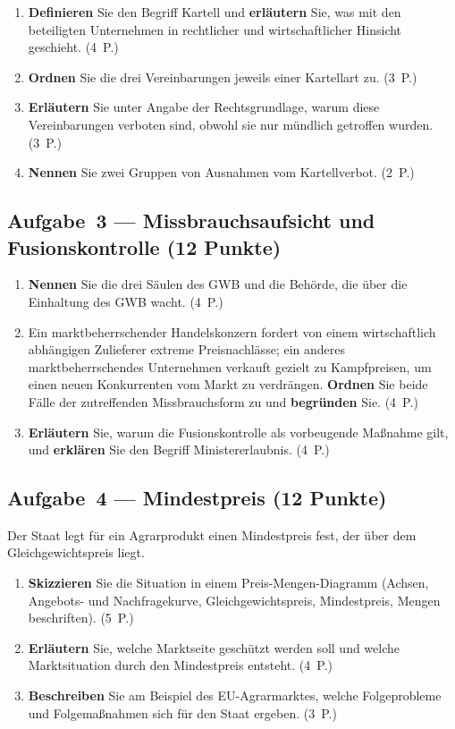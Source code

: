 \documentclass[11pt, a4paper]{article}
\begin{document}
\begin{enumerate}[label=(\alph*)]
  \item \textbf{Definieren} Sie den Begriff Kartell und \textbf{erläutern} Sie, was mit den beteiligten Unternehmen in rechtlicher und wirtschaftlicher Hinsicht geschieht. \hfill (4~P.)
  \item \textbf{Ordnen} Sie die drei Vereinbarungen jeweils einer Kartellart zu. \hfill (3~P.)
  \item \textbf{Erläutern} Sie unter Angabe der Rechtsgrundlage, warum diese Vereinbarungen verboten sind, obwohl sie nur mündlich getroffen wurden. \hfill (3~P.)
  \item \textbf{Nennen} Sie zwei Gruppen von Ausnahmen vom Kartellverbot. \hfill (2~P.)
\end{enumerate}

\subsection*{Aufgabe~3 --- Missbrauchsaufsicht und Fusionskontrolle (12 Punkte)}

\begin{enumerate}[label=(\alph*)]
  \item \textbf{Nennen} Sie die drei Säulen des GWB und die Behörde, die über die Einhaltung des GWB wacht. \hfill (4~P.)
  \item Ein marktbeherrschender Handelskonzern fordert von einem wirtschaftlich abhängigen Zulieferer extreme Preisnachlässe; ein anderes marktbeherrschendes Unternehmen verkauft gezielt zu Kampfpreisen, um einen neuen Konkurrenten vom Markt zu verdrängen. \textbf{Ordnen} Sie beide Fälle der zutreffenden Missbrauchsform zu und \textbf{begründen} Sie. \hfill (4~P.)
  \item \textbf{Erläutern} Sie, warum die Fusionskontrolle als vorbeugende Maßnahme gilt, und \textbf{erklären} Sie den Begriff Ministererlaubnis. \hfill (4~P.)
\end{enumerate}

\subsection*{Aufgabe~4 --- Mindestpreis (12 Punkte)}

Der Staat legt für ein Agrarprodukt einen Mindestpreis fest, der über dem
Gleichgewichtspreis liegt.

\begin{enumerate}[label=(\alph*)]
  \item \textbf{Skizzieren} Sie die Situation in einem Preis-Mengen-Diagramm (Achsen, Angebots- und Nachfragekurve, Gleichgewichtspreis, Mindestpreis, Mengen beschriften). \hfill (5~P.)
  \item \textbf{Erläutern} Sie, welche Marktseite geschützt werden soll und welche Marktsituation durch den Mindestpreis entsteht. \hfill (4~P.)
  \item \textbf{Beschreiben} Sie am Beispiel des EU-Agrarmarktes, welche Folgeprobleme und Folgemaßnahmen sich für den Staat ergeben. \hfill (3~P.)
\end{enumerate}
\end{document}
